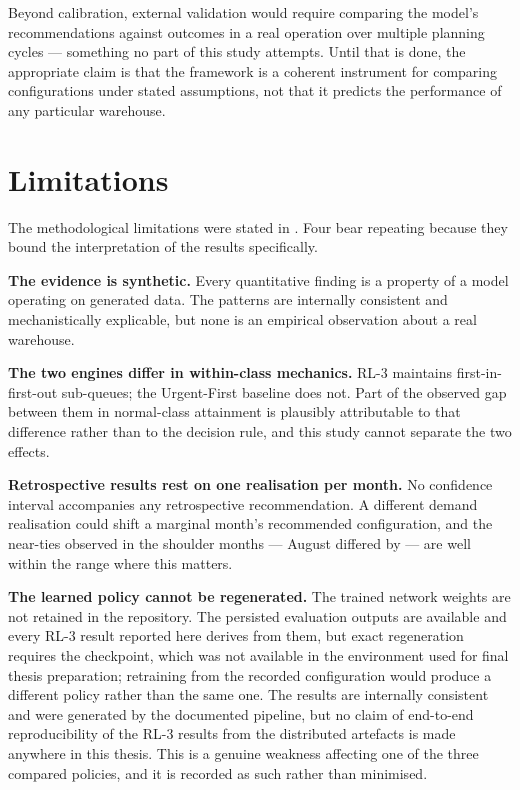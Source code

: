 Beyond calibration, external validation would require comparing the model's recommendations
against outcomes in a real operation over multiple planning cycles --- something no part of this
study attempts. Until that is done, the appropriate claim is that the framework is a coherent
instrument for comparing configurations under stated assumptions, not that it predicts the
performance of any particular warehouse.

\section{Limitations}
\label{sec:disc-limitations}

The methodological limitations were stated in . Four bear
repeating because they bound the interpretation of the results specifically.

\textbf{The evidence is synthetic.} Every quantitative finding is a property of a model
operating on generated data. The patterns are internally consistent and mechanistically
explicable, but none is an empirical observation about a real warehouse.

\textbf{The two engines differ in within-class mechanics.} RL-3 maintains first-in-first-out
sub-queues; the Urgent-First baseline does not. Part of the observed gap between them in
normal-class attainment is plausibly attributable to that difference rather than to the decision
rule, and this study cannot separate the two effects.

\textbf{Retrospective results rest on one realisation per month.} No confidence interval
accompanies any retrospective recommendation. A different demand realisation could shift a
marginal month's recommended configuration, and the near-ties observed in the shoulder months
--- August differed by  --- are well within the range where this matters.

\textbf{The learned policy cannot be regenerated.} The trained network weights are not retained
in the repository. The persisted evaluation outputs are available and every RL-3 result reported
here derives from them, but exact regeneration requires the checkpoint, which was not available
in the environment used for final thesis preparation; retraining from the recorded configuration
would produce a different policy rather than the same one. The results are internally consistent
and were generated by the documented pipeline, but no claim of end-to-end reproducibility of the
RL-3 results from the distributed artefacts is made anywhere in this thesis. This is a genuine
weakness affecting one of the three compared policies, and it is recorded as such rather than
minimised.

